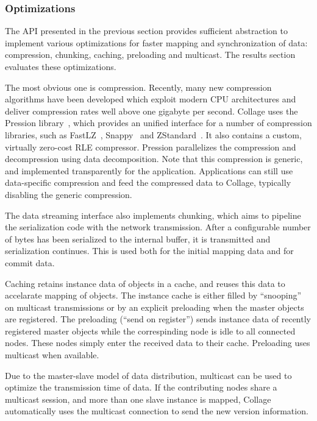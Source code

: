 \documentclass[10pt,journal,compsoc]{IEEEtran}
\begin{document}
\subsubsection{Optimizations}

The API presented in the previous section provides sufficient abstraction to
implement various optimizations for faster mapping and synchronization of data:
compression, chunking, caching, preloading and multicast. The results section
evaluates these optimizations.

The most obvious one is compression. Recently, many new compression algorithms
have been developed which exploit modern CPU architectures and deliver
compression rates well above one gigabyte per second. Collage uses the Pression
library~\cite{pression}, which provides an unified interface for a number of
compression libraries, such as FastLZ~\cite{jesperfast}, Snappy~\cite{snappy}
and ZStandard~\cite{zstd}. It also contains a custom, virtually zero-cost RLE
compressor. Pression parallelizes the compression and decompression using
data decomposition. Note that this compression is generic, and implemented
transparently for the application. Applications can still use data-specific
compression and feed the compressed data to Collage, typically disabling the
generic compression.

The data streaming interface also implements chunking, which aims to pipeline
the serialization code with the network transmission. After a configurable
number of bytes has been serialized to the internal buffer, it is transmitted
and serialization continues. This is used both for the initial mapping data and
for commit data.

Caching retains instance data of objects in a cache, and reuses this data to
accelarate mapping of objects. The instance cache is either filled by
``snooping'' on multicast transmissions or by an explicit preloading when the
master objects are registered. The preloading (``send on register'') sends
instance data of recently registered master objects while the correspinding node
is idle to all connected nodes. These nodes simply enter the received data to
their cache. Preloading uses multicast when available.

Due to the master-slave model of data distribution, multicast can be used to
optimize the transmission time of data. If the contributing nodes share a
multicast session, and more than one slave instance is mapped, Collage
automatically uses the multicast connection to send the new version
information.
\end{document}
